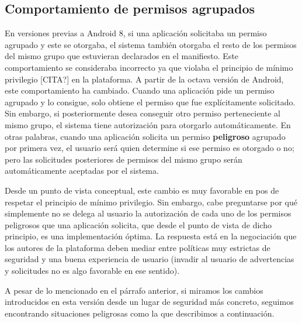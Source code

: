 \subsection{Comportamiento de permisos agrupados}
\label{subsection:recent-changes:grouped-permissions}
En versiones previas a Android 8, si una aplicación solicitaba un permiso agrupado y este se
otorgaba, el sistema también otorgaba el resto de los permisos del mismo grupo que estuvieran
declarados en el manifiesto. Este comportamiento se consideraba incorrecto ya que violaba el
principio de mínimo privilegio [CITA?] en la plataforma. A partir de la octava versión de Android,
este comportamiento ha cambiado. Cuando una aplicación pide un permiso agrupado y lo consigue, solo
obtiene el permiso que fue explícitamente solicitado. Sin embargo, si posteriormente desea conseguir
otro permiso perteneciente al mismo grupo, el sistema tiene autorización para otorgarlo
automáticamente. En otras palabras, cuando una aplicación solicita un permiso \textbf{peligroso}
agrupado por primera vez, el usuario será quien determine si ese permiso es otorgado o no; pero las
solicitudes posteriores de permisos del mismo grupo serán automáticamente aceptadas por el sistema.

Desde un punto de vista conceptual, este cambio es muy favorable en pos de respetar el principio de
mínimo privilegio. Sin embargo, cabe preguntarse por qué simplemente no se delega al usuario la
autorización de cada uno de los permisos peligrosos que una aplicación solicita, que desde el punto
de vista de dicho principio, es una implementación óptima. La respuesta está en la negociación que
los autores de la plataforma deben mediar entre políticas muy estrictas de seguridad y una buena
experiencia de usuario (invadir al usuario de advertencias y solicitudes no es algo favorable en ese
sentido).

A pesar de lo mencionado en el párrafo anterior, si miramos los cambios introducidos en esta versión
desde un lugar de seguridad más concreto, seguimos encontrando situaciones peligrosas como la que
describimos a continuación.

